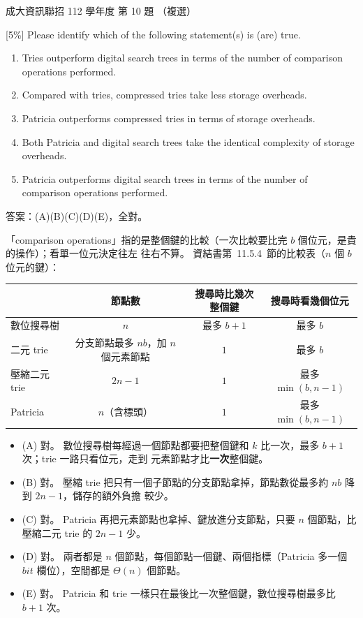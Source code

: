 \begin{pastexam}[label={px:ncku-112-prog-10}]{成大資訊聯招 112 學年度 第 10 題}
（複選）

{[5\%]} Please identify which of the following statement(s) is (are) true.
\begin{enumerate}[label=(\Alph*)]
\item Tries outperform digital search trees in terms of the number of comparison operations performed.
\item Compared with tries, compressed tries take less storage overheads.
\item Patricia outperforms compressed tries in terms of storage overheads.
\item Both Patricia and digital search trees take the identical complexity of storage overheads.
\item Patricia outperforms digital search trees in terms of the number of comparison operations
performed.
\end{enumerate}
\end{pastexam}

\begin{pastsoln}
答案：(A)(B)(C)(D)(E)，全對。

「comparison operations」指的是整個鍵的比較（一次比較要比完 $b$ 個位元，是貴的操作）；看單一位元決定往左
往右不算。 資結書第~11.5.4~節的比較表（$n$ 個 $b$ 位元的鍵）：
\begin{center}
\small
\begin{tabular}{lccc}
\toprule
& 節點數 & 搜尋時比幾次整個鍵 & 搜尋時看幾個位元 \\
\midrule
數位搜尋樹 & $n$ & 最多 $b + 1$ & 最多 $b$ \\
二元 trie & 分支節點最多 $nb$，加 $n$ 個元素節點 & $1$ & 最多 $b$ \\
壓縮二元 trie & $2n - 1$ & $1$ & 最多 $\min(b, n - 1)$ \\
Patricia & $n$（含標頭） & $1$ & 最多 $\min(b, n - 1)$ \\
\bottomrule
\end{tabular}
\end{center}

\begin{itemize}
\item (A) 對。 數位搜尋樹每經過一個節點都要把整個鍵和 $k$ 比一次，最多 $b + 1$ 次；trie 一路只看位元，走到
元素節點才比\textbf{一次}整個鍵。
\item (B) 對。 壓縮 trie 把只有一個子節點的分支節點拿掉，節點數從最多約 $nb$ 降到 $2n - 1$，儲存的額外負擔
較少。
\item (C) 對。 Patricia 再把元素節點也拿掉、鍵放進分支節點，只要 $n$ 個節點，比壓縮二元 trie 的 $2n - 1$ 少。
\item (D) 對。 兩者都是 $n$ 個節點，每個節點一個鍵、兩個指標（Patricia 多一個 $\mathit{bit}$ 欄位），空間都是
$\Theta(n)$ 個節點。
\item (E) 對。 Patricia 和 trie 一樣只在最後比一次整個鍵，數位搜尋樹最多比 $b + 1$ 次。
\end{itemize}
\end{pastsoln}
